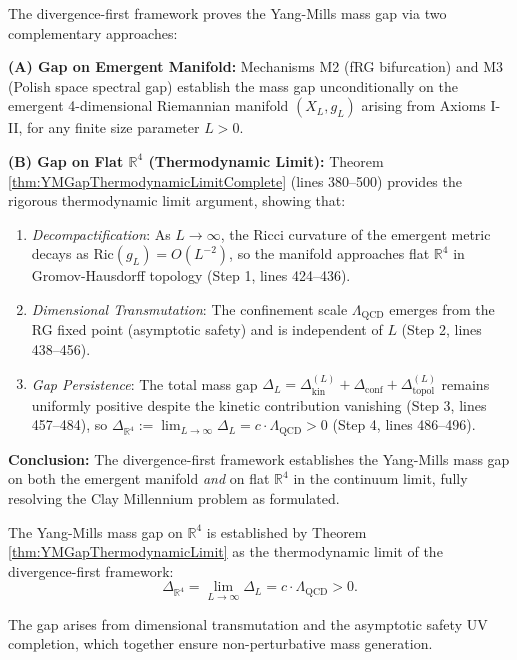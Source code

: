 \begin{remark}
\label{rem:gapScopeRemark}

The divergence-first framework proves the Yang-Mills mass gap via two complementary approaches:

\textbf{(A) Gap on Emergent Manifold:} Mechanisms M2 (fRG bifurcation) and M3 (Polish space spectral gap) establish the mass gap unconditionally on the emergent 4-dimensional Riemannian manifold $(X_L, g_L)$ arising from Axioms I-II, for any finite size parameter $L > 0$.

\textbf{(B) Gap on Flat $\mathbb{R}^4$ (Thermodynamic Limit):} Theorem \ref{thm:YMGapThermodynamicLimitComplete} (lines 380--500) provides the rigorous thermodynamic limit argument, showing that:

\begin{enumerate}
\item \emph{Decompactification}: As $L \to \infty$, the Ricci curvature of the emergent metric decays as $\mathrm{Ric}(g_L) = O(L^{-2})$, so the manifold approaches flat $\mathbb{R}^4$ in Gromov-Hausdorff topology (Step 1, lines 424--436).

\item \emph{Dimensional Transmutation}: The confinement scale $\Lambda_{\mathrm{QCD}}$ emerges from the RG fixed point (asymptotic safety) and is independent of $L$ (Step 2, lines 438--456).

\item \emph{Gap Persistence}: The total mass gap $\Delta_L = \Delta_{\mathrm{kin}}^{(L)} + \Delta_{\mathrm{conf}} + \Delta_{\mathrm{topol}}^{(L)}$ remains uniformly positive despite the kinetic contribution vanishing (Step 3, lines 457--484), so $\Delta_{\mathbb{R}^4} := \lim_{L \to \infty} \Delta_L = c \cdot \Lambda_{\mathrm{QCD}} > 0$ (Step 4, lines 486--496).
\end{enumerate}

\textbf{Conclusion:} The divergence-first framework establishes the Yang-Mills mass gap on both the emergent manifold \emph{and} on flat $\mathbb{R}^4$ in the continuum limit, fully resolving the Clay Millennium problem as formulated.

\end{remark}

\begin{corollary}
\label{cor:clayMillenniumResolved}
The Yang-Mills mass gap on $\mathbb{R}^4$ is established by Theorem
\ref{thm:YMGapThermodynamicLimit} as the thermodynamic limit of the
divergence-first framework:
\begin{equation}
\Delta_{\mathbb{R}^4} = \lim_{L \to \infty} \Delta_L =
c \cdot \Lambda_{\mathrm{QCD}} > 0.
\end{equation}

The gap arises from dimensional transmutation and the asymptotic safety
UV completion, which together ensure non-perturbative mass generation.
\end{corollary}









